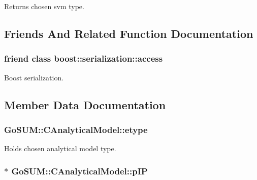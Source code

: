 Returns chosen svm type. 



\subsection{Friends And Related Function Documentation}
\hypertarget{class_go_s_u_m_1_1_c_analytical_model_ac98d07dd8f7b70e16ccb9a01abf56b9c}{
\subsubsection[{boost\-::serialization\-::access}]{\setlength{\rightskip}{0pt plus 5cm}friend class boost\-::serialization\-::access\hspace{0.3cm}{\ttfamily [friend]}}}\label{class_go_s_u_m_1_1_c_analytical_model_ac98d07dd8f7b70e16ccb9a01abf56b9c}


Boost serialization. 



\subsection{Member Data Documentation}
\hypertarget{class_go_s_u_m_1_1_c_analytical_model_acb4d7f4128a67445757b81c9d82a4ffe}{
\subsubsection[{etype}]{ Go\-S\-U\-M\-::\-C\-Analytical\-Model\-::etype\hspace{0.3cm}{\ttfamily [private]}}}\label{class_go_s_u_m_1_1_c_analytical_model_acb4d7f4128a67445757b81c9d82a4ffe}


Holds chosen analytical model type. 

\hypertarget{class_go_s_u_m_1_1_c_analytical_model_ad7743d89d391a77a3328db3497e800db}{
\subsubsection[{p\-I\-P}]{$\ast$ Go\-S\-U\-M\-::\-C\-Analytical\-Model\-::p\-I\-P\hspace{0.3cm}{\ttfamily [private]}}}\label{class_go_s_u_m_1_1_c_analytical_model_ad7743d89d391a77a3328db3497e800db}


